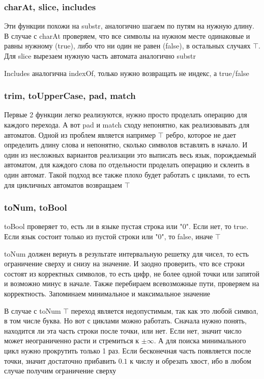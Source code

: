 \subsubsection*{charAt, slice, includes}
Эти функции похожи на substr, аналогично шагаем по путям на нужную длину. В случае с charAt проверяем, что все символы на нужном месте одинаковые и равны нужному (true), либо что ни один не равен (false), в остальных случаях $\top$. Для slice вырезаем нужную часть автомата аналогично substr

Includes аналогична indexOf, только нужно возвращать не индекс, а true/false

\subsubsection*{trim, toUpperCase, pad, match}
Первые 2 функции легко реализуются, нужно просто проделать операцию для каждого перехода. А вот pad и match сходу непонятно, как реализовывать для автоматов. Одной из проблем является например $\top$ ребро, которое не дает определить длину слова и непонятно, сколько символов вставлять в начало. И один из несложных вариантов реализации это выписать весь язык, порождаемый автоматом, для каждого слова по отдельности проделать операцию и склеить в один автомат. Такой подход все также плохо будет работать с циклами, то есть для цикличных автоматов возвращаем $\top$

\subsubsection*{toNum, toBool}
toBool проверяет то, есть ли в языке пустая строка или "0". Если нет, то true. Если язык состоит только из пустой строки или "0", то false, иначе $\top$

toNum должен вернуть в результате интервальную решетку для чисел, то есть ограничение сверху и снизу на значение. И заодно проверить, что все строки состоят из корректных символов, то есть цифр, не более одной точки или запятой и возможно минус в начале. Также перебираем всевозможные пути, проверяем на корректность. Запоминаем минимальное и максимальное значение

В случае с toNum $\top$ переход является недопустимым, так как это любой символ, в том числе буква. Но вот с циклами можно работать. Сначала нужно понять, находится ли эта часть строки после точки, или нет. Если нет, значит число может неограниченно расти и стремиться к $\pm \infty$. А для поиска минимального цикл нужно прокрутить только 1 раз. Если бесконечная часть появляется после точки, значит достаточно прибавить $0.1$ к числу и обрезать хвост, ибо в любом случае получим ограничение сверху

